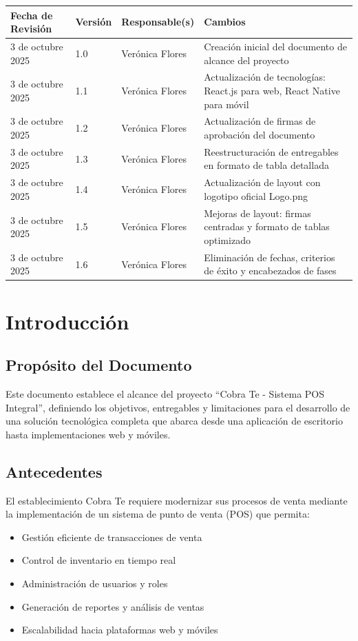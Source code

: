 \documentclass[12pt,letterpaper]{article}
\begin{document}
\begin{longtable}{|p{3cm}|p{2cm}|p{4cm}|p{6cm}|}
\hline
\rowcolor{cobrablue!20}
\textbf{Fecha de Revisión} & \textbf{Versión} & \textbf{Responsable(s)} & \textbf{Cambios} \\
\hline
\endhead
3 de octubre 2025 & 1.0 & Verónica Flores & Creación inicial del documento de alcance del proyecto \\
\hline
3 de octubre 2025 & 1.1 & Verónica Flores & Actualización de tecnologías: React.js para web, React Native para móvil \\
\hline
3 de octubre 2025 & 1.2 & Verónica Flores & Actualización de firmas de aprobación del documento \\
\hline
3 de octubre 2025 & 1.3 & Verónica Flores & Reestructuración de entregables en formato de tabla detallada \\
\hline
3 de octubre 2025 & 1.4 & Verónica Flores & Actualización de layout con logotipo oficial Logo.png \\
\hline
3 de octubre 2025 & 1.5 & Verónica Flores & Mejoras de layout: firmas centradas y formato de tablas optimizado \\
\hline
3 de octubre 2025 & 1.6 & Verónica Flores & Eliminación de fechas, criterios de éxito y encabezados de fases \\
\hline
\end{longtable}

\newpage

\section{Introducción}

\subsection{Propósito del Documento}
Este documento establece el alcance del proyecto ``Cobra Te - Sistema POS Integral'', definiendo los objetivos, entregables y limitaciones para el desarrollo de una solución tecnológica completa que abarca desde una aplicación de escritorio hasta implementaciones web y móviles.

\subsection{Antecedentes}
El establecimiento Cobra Te requiere modernizar sus procesos de venta mediante la implementación de un sistema de punto de venta (POS) que permita:
\begin{itemize}
    \item Gestión eficiente de transacciones de venta
    \item Control de inventario en tiempo real
    \item Administración de usuarios y roles
    \item Generación de reportes y análisis de ventas
    \item Escalabilidad hacia plataformas web y móviles
\end{itemize}
\end{document}

